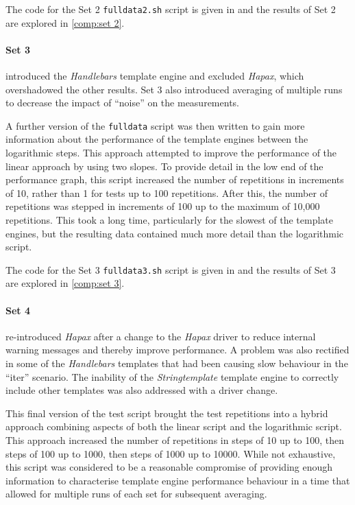 The code for the Set 2 \texttt{fulldata2.sh} script is given in  and the results of Set 2 are explored in \autoref{comp:set 2}.

\paragraph{Set 3} introduced the \emph{Handlebars} template engine and excluded \emph{Hapax}, which overshadowed the other results. Set 3 also introduced averaging of multiple runs to decrease the impact of \enquote{noise} on the measurements.

A further version of the \texttt{fulldata} script was then written to gain more information about the performance of the \gls{template engine}s between the logarithmic steps. This approach attempted to improve the performance of the linear approach by using two slopes. To provide detail in the low end of the performance graph, this script increased the number of repetitions in increments of 10, rather than 1 for tests up to 100 repetitions. After this, the number of repetitions was stepped in increments of 100 up to the maximum of 10,000 repetitions. This took a long time, particularly for the slowest of the \gls{template engine}s, but the resulting data contained much more detail than the logarithmic script.

The code for the Set 3 \texttt{fulldata3.sh} script is given in  and the results of Set 3 are explored in \autoref{comp:set 3}.

\paragraph{Set 4} re-introduced \emph{Hapax} after a change to the \emph{Hapax} driver to reduce internal warning messages and thereby improve performance. A problem was also rectified in some of the \emph{Handlebars} templates that had been causing slow behaviour in the \enquote{iter} scenario. The inability of the \emph{Stringtemplate} \gls{template engine} to correctly include other templates was also addressed with a driver change.

This final version of the test script brought the test repetitions into a hybrid approach combining aspects of both the linear script and the logarithmic script. This approach increased the number of repetitions in steps of 10 up to 100, then steps of 100 up to 1000, then steps of 1000 up to 10000. While not exhaustive, this script was considered to be a reasonable compromise of providing enough information to characterise \gls{template engine} performance behaviour in a time that allowed for multiple runs of each set for subsequent averaging.

